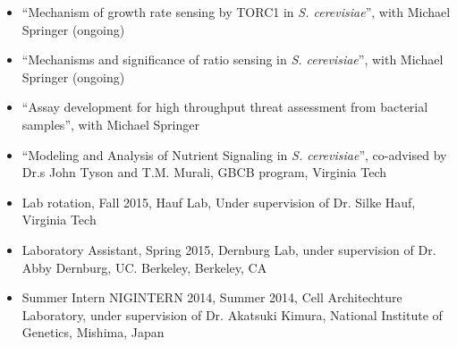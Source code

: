 \documentclass[10pt,a4paper,ragged2e]{altacv}
\begin{document}
\begin{itemize}
\item ``Mechanism of growth rate sensing by TORC1 in \textit{S. cerevisiae}'', with Michael Springer (ongoing)
\item ``Mechanisms and significance of ratio sensing in \textit{S. cerevisiae}'', with Michael Springer (ongoing)
\item ``Assay development for high throughput threat assessment from bacterial samples'', with Michael Springer 
\item ``Modeling and Analysis of Nutrient Signaling in \textit{S. cerevisiae}'', co-advised by Dr.s John Tyson and T.M. Murali, GBCB program, Virginia Tech
  \item Lab rotation, Fall 2015, Hauf Lab, Under supervision of Dr. Silke Hauf, Virginia Tech
  \item Laboratory Assistant, Spring 2015, Dernburg Lab, under supervision of Dr. Abby Dernburg, UC. Berkeley, Berkeley, CA
  \item Summer Intern  NIGINTERN 2014, Summer 2014, Cell Architechture Laboratory, under supervision of Dr. Akatsuki Kimura, National Institute of Genetics, Mishima, Japan
\end{itemize}




\end{document}

